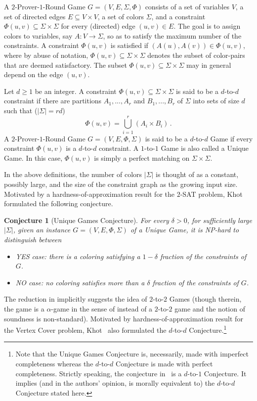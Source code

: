 \documentclass{toc}
\newtheorem{rconj}[theorem]{Conjecture}
\begin{document}
\begin{definition}\label{def:game}
A $2$-Prover-$1$-Round Game $G=(V,E,\Sigma,\Phi)$ consists of a set of variables $V$, a set of directed edges
$E\subseteq V\times V$, a set of colors $\Sigma$, and
a constraint $\Phi(u,v)\subseteq \Sigma\times \Sigma$ for every (directed) edge $(u,v) \in E$. The goal is to assign colors to variables, say
 $A: V \to \Sigma$, so as to satisfy the maximum number of the constraints. A constraint $\Phi(u,v)$
is satisfied if $ (A(u), A(v)) \in \Phi(u,v)$, where by abuse of notation, $\Phi(u,v) \subseteq \Sigma
\times \Sigma$ denotes the subset of color-pairs that are deemed satisfactory. The subset  $\Phi(u,v) \subseteq \Sigma \times \Sigma$
may in general depend on the edge $(u,v)$.

Let $d \geqslant 1$ be an integer. A constraint $\Phi(u,v) \subseteq \Sigma \times \Sigma$ is said to be a $d$-to-$d$ constraint if
there are partitions
$A_1,...,A_r$ and  $B_1,...,B_r$ of $\Sigma$ into sets of size $d$  such that ($|\Sigma| = rd$)
\[
\Phi(u,v)=\bigcup\limits_{i=1}^r{(A_i\times B_i)}\,.%
\]
A $2$-Prover-$1$-Round Game $G=(V,E,\Phi,\Sigma)$ is said to be a $d$-to-$d$ Game if every constraint $\Phi(u,v)$ is a $d$-to-$d$ constraint.
A $1$-to-$1$ Game is also called a Unique Game. In this case, $\Phi(u,v)$ is simply a perfect matching on $\Sigma \times \Sigma$.
%
%
\end{definition}

In the above definitions, the number of colors $|\Sigma|$ is thought of as a constant,
possibly large, and the
size of the constraint graph as the growing input size.
Motivated by a hardness-of-approximation result for the $2$-SAT problem,
Khot~\cite{Khot02} formulated the %
following conjecture. %

%
%
%
\begin{rconj}[Unique Games Conjecture]\label{conj:ugc}
For every  %
$\delta>0$, for sufficiently large  %
$|\Sigma|$,
given an instance $G=(V,E,\Phi,\Sigma)$ of a Unique Game, it is NP-hard
to distinguish between
\begin{itemize}
\item YES case: there is a coloring satisfying
a %
$1-\delta$ fraction of the constraints of $G$.
\item NO case: no coloring satisfies more than
a %
$\delta$ fraction of the constraints of $G$.
\end{itemize}
\end{rconj}

The reduction in \cite{DS05} implicitly suggests the idea of $2$-to-$2$ Games (though
therein, the game is a $\alpha$-game in the sense
of \cite{DinurMosselRegev} instead of a $2$-to-$2$ game and
the notion of soundness is non-standard). Motivated by hardness-of-approximation result for the Vertex Cover
problem,  Khot~\cite{Khot02} also formulated the $d$-to-$d$ Conjecture.\footnote{Note that the Unique Games Conjecture is, necessarily,
made with imperfect completeness whereas the $d$-to-$d$ Conjecture is made with perfect completeness. Strictly speaking, the conjecture
in~\cite{Khot02} is a $d$-to-$1$ Conjecture. It implies (and in the authors' opinion,
is morally equivalent to) the $d$-to-$d$ Conjecture stated here.}
\end{document}
